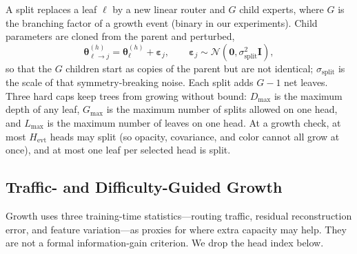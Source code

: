 A split replaces a leaf $\ell$ by a new linear router and $G$ child experts, where $G$ is the branching factor of a growth event (binary in our experiments).
Child parameters are cloned from the parent and perturbed,
\begin{equation}
\boldsymbol{\theta}_{\ell\rightarrow j}^{(h)}
=
\boldsymbol{\theta}_{\ell}^{(h)}+\boldsymbol{\varepsilon}_{j},
\qquad
\boldsymbol{\varepsilon}_{j}\sim\mathcal{N}(\mathbf{0},\sigma_{\mathrm{split}}^{2}\mathbf{I}),
\label{eq:split}
\end{equation}
so that the $G$ children start as copies of the parent but are not identical;
$\sigma_{\mathrm{split}}$ is the scale of that symmetry-breaking noise.
Each split adds $G-1$ net leaves.
Three hard caps keep trees from growing without bound:
$D_{\max}$ is the maximum depth of any leaf,
$G_{\max}$ is the maximum number of splits allowed on one head,
and $L_{\max}$ is the maximum number of leaves on one head.
At a growth check, at most $H_{\mathrm{evt}}$ heads may split (so opacity, covariance, and color cannot all grow at once), and at most one leaf per selected head is split.

\subsection{Traffic- and Difficulty-Guided Growth}
\label{sec:growth}

Growth uses three training-time statistics---routing traffic, residual reconstruction error, and feature variation---as proxies for where extra capacity may help.
They are not a formal information-gain criterion.
We drop the head index below.

